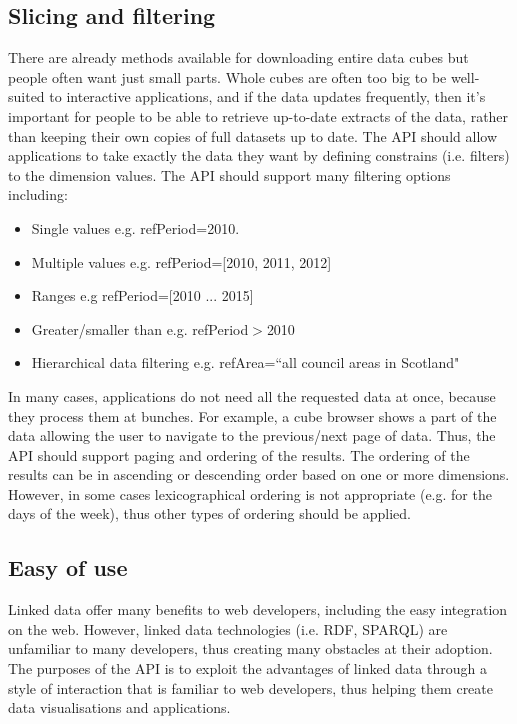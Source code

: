 \documentclass{llncs}
\begin{document}
\subsection{Slicing and filtering}\label{sec:slice}

There are already methods available for downloading entire data cubes but people often want just small parts.  Whole cubes are often too big to be well-suited to interactive applications, and if the data updates frequently,  then it's important for people to be able to retrieve up-to-date extracts of the data, rather than keeping their own copies of full datasets up to date. The API should allow applications to take exactly the data they want by defining constrains (i.e. filters) to the dimension values. The API should support many filtering options including:
\begin{itemize}
\item Single values e.g. refPeriod=2010.
\item Multiple values e.g. refPeriod=[2010, 2011, 2012]
\item Ranges e.g refPeriod=[2010 ... 2015]
\item Greater/smaller than e.g. refPeriod$>$2010
\item Hierarchical data filtering e.g. refArea=``all council areas in Scotland"
\end{itemize}

In many cases, applications do not need all the requested data at once, because they process them at bunches. For example, a cube browser shows a part of the data allowing the user to navigate to the previous/next page of data. Thus, the API should support paging and ordering of the results. The ordering of the results can be in ascending or descending order based on one or more dimensions. However, in some cases lexicographical ordering is not appropriate (e.g. for the days of the week), thus other types of ordering should be applied.

\subsection{Easy of use}

Linked data offer many benefits to web developers, including the easy integration on the web. However, linked data technologies (i.e. RDF, SPARQL) are unfamiliar to many developers, thus creating many obstacles at their adoption. The purposes of the API is to exploit the advantages of linked data through a style of interaction that is familiar to web developers, thus helping them create data visualisations and applications.
\end{document}

